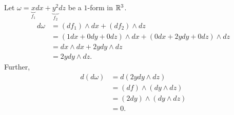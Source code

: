 \documentclass[11pt]{article}
\begin{document}
\begin{example} Let $\omega = \underbrace{x}_{f_1} dx + \underbrace{y^2}_{f_2} dz$ be a $1$-form in $\mathbb{R}^3$. \begin{align*} d \omega & = (df_1) \wedge dx + (df_2) \wedge dz \\ & = (1 dx + 0 dy + 0 dz) \wedge dx + (0dx + 2y dy + 0 dz) \wedge dz \\ & = dx \wedge dx + 2y dy \wedge dz \\ & = 2y dy \wedge dz.
\end{align*} Further, \begin{align*} d(d\omega) & = d (2y dy \wedge dz) \\ & = (df) \wedge (dy \wedge dz) \\ & = (2dy) \wedge (dy \wedge dz) \\ & = 0.
\end{align*}
\end{example}
  
\end{document}
